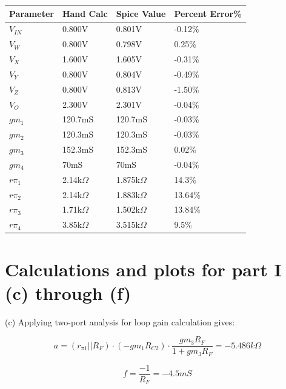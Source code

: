 \documentclass[12pt,a4paper]{article}
\begin{document}
\begin{table}[h]
\centering
\begin{tabular}{|l|l|l|l|}
\hline
Parameter & Hand Calc &  Spice Value & Percent Error\% \\
\hline
$V_{IN}$ & 0.800V &  0.801V &  -0.12\%\\
\hline
$V_{W}$ & 0.800V &  0.798V &  0.25\%\\
\hline
$V_{X}$ & 1.600V &  1.605V &  -0.31\%\\
\hline
$V_{Y}$ & 0.800V &  0.804V &  -0.49\%\\
\hline
$V_{Z}$ & 0.800V &  0.813V &  -1.50\%\\
\hline
$V_{O}$ & 2.300V &  2.301V &  -0.04\%\\
\hline
$gm_{1}$ & 120.7mS & 120.7mS &  -0.03\%\\
\hline
$gm_{2}$ & 120.3mS & 120.3mS &  -0.03\%\\
\hline
$gm_{3}$ & 152.3mS & 152.3mS &  0.02\%\\
\hline
$gm_{4}$ & 70mS & 70mS &  -0.04\%\\
\hline
$r\pi_{1}$ & 2.14k$\Omega$ & 1.875k$\Omega$ &  14.3\%\\
\hline
$r\pi_{2}$ & 2.14k$\Omega$ & 1.883k$\Omega$ &  13.64\%\\
\hline
$r\pi_{3}$ & 1.71k$\Omega$ & 1.502k$\Omega$ &  13.84\%\\
\hline
$r\pi_{4}$ & 3.85k$\Omega$ & 3.515k$\Omega$ &  9.5\%\\
\hline
\end{tabular}
\end{table}

\pagebreak


\section{Calculations and plots for part I (c) through (f)}

(c) Applying two-port analysis for loop gain calculation gives:

\begin{equation}
  a = (r_{\pi1} || R_{F}) \cdot (-gm_1 R_{C2} ) \cdot \frac{gm_3 R_F}{1 + gm_3 R_F} = -5.486k\Omega
\end{equation}

\begin{equation}
  f = \frac{-1}{R_F} = -4.5mS
\end{equation}
\end{document}
